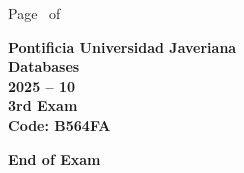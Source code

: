 \documentclass[11pt, addpoints, answers]{exam}\usepackage[utf8]{inputenc}
\begin{document}
\begin{coverpages}
\begin{center}
			\vspace{3mm}
			\leavevmode \hspace{5mm} 
		\end{center}
	\end{coverpages}

	\footer{} {Page \thepage\ of \numpages} {}

	\centering
	\textbf{\Large Pontificia Universidad Javeriana}\\
	\textbf{\Large Databases} \\
	\textbf{\large 2025 -- 10} \\
	\textbf{\large 3rd Exam} \\
	\textbf{Code: B564FA}


	\begin{questions}
		
		
		
		
		
		
		
		
		
		
		
		
		
		
		
		
		
		
		
		
	\end{questions}

	\vspace{5mm}
	\noindent \textbf{End of Exam}
\end{document}

